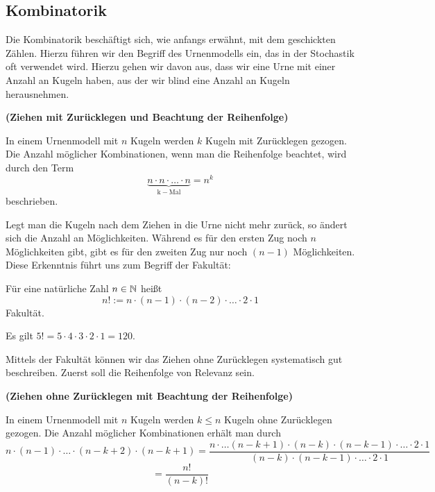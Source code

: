 \documentclass[ngerman, 12pt]{nssheetxea}
\begin{document}
\newpage
\subsection{Kombinatorik}
\label{ssec:Kombinatorik}
Die Kombinatorik beschäftigt sich, wie anfangs erwähnt, mit dem geschickten Zählen. Hierzu führen wir den Begriff des Urnenmodells ein, das in der Stochastik oft verwendet wird. Hierzu gehen wir davon aus, dass wir eine Urne mit einer Anzahl an Kugeln haben, aus der wir blind eine Anzahl an Kugeln herausnehmen. 

\begin{theorem} \textbf{(Ziehen mit Zurücklegen und Beachtung der Reihenfolge)} \par
In einem Urnenmodell mit $n$ Kugeln werden $k$ Kugeln mit Zurücklegen gezogen. Die Anzahl möglicher Kombinationen, wenn man die Reihenfolge beachtet, wird durch den Term
\[ \underbrace{n \cdot n \cdot \ldots \cdot n}_{\mathrm{k-Mal}} = n^k \]
beschrieben.
\end{theorem}

Legt man die Kugeln nach dem Ziehen in die Urne nicht mehr zurück, so ändert sich die Anzahl an Möglichkeiten. Während es für den ersten Zug noch $n$ Möglichkeiten gibt, gibt es für den zweiten Zug nur noch $(n-1)$ Möglichkeiten. Diese Erkenntnis führt uns zum Begriff der Fakultät:

\begin{definition}
Für eine natürliche Zahl $n\in \mathbb{N}$ heißt 
\[ n! := n \cdot (n-1) \cdot (n-2) \cdot \ldots \cdot 2 \cdot 1\]
Fakultät. 
\end{definition}

\begin{example}
Es gilt $5!=5\cdot 4 \cdot 3 \cdot 2 \cdot 1 = 120$.
\end{example}

Mittels der Fakultät können wir das Ziehen ohne Zurücklegen systematisch gut beschreiben. Zuerst soll die Reihenfolge von Relevanz sein. 

\begin{theorem} \textbf{(Ziehen ohne Zurücklegen mit Beachtung der Reihenfolge)} \par
In einem Urnenmodell mit $n$ Kugeln werden $k\leq n$ Kugeln ohne Zurücklegen gezogen. Die Anzahl möglicher Kombinationen erhält man durch
\[ n\cdot (n-1) \cdot \ldots \cdot (n-k+2) \cdot (n-k+1) = \dfrac{n \cdot \ldots (n-k+1) \cdot (n-k) \cdot (n-k-1) \cdot \ldots \cdot 2 \cdot 1}{(n-k) \cdot (n-k-1) \cdot \ldots \cdot 2 \cdot 1} \] \[ = \dfrac{n!}{(n-k)!}  \]
\end{theorem}
\end{document}
